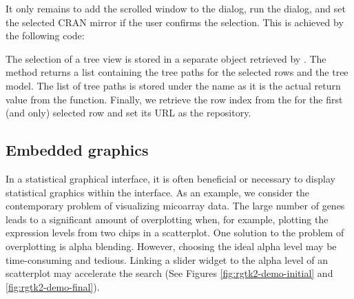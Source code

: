 \documentclass[article,shortnames]{jss}
\begin{document}
It only remains to add the scrolled window to the dialog, run the
dialog, and set the selected CRAN mirror if the user confirms the
selection. This is achieved by the following code:
%
The selection of a tree view is stored in a separate
 object retrieved by
. The  method
returns a list containing the tree paths for the selected rows and the
tree model. The list of tree paths is stored under the name
 as it is the actual return value from the 
function. Finally, we retrieve the row index from the
 for the first (and only) selected row and set its
URL as the repository.


\subsection[Embedded R graphics]{Embedded 
graphics}\label{sec:embedded-graphics}

In a statistical graphical interface, it is often beneficial or
necessary to display statistical graphics within the interface. As
an example, we consider the contemporary problem of visualizing
micoarray data. The large number of genes leads to a significant
amount of overplotting when, for example, plotting the expression
levels from two chips in a scatterplot. One solution to the problem of
overplotting is alpha blending. However, choosing the ideal alpha
level may be time-consuming and tedious. Linking a slider widget to
the alpha level of an  scatterplot may accelerate the
search (See Figures \ref{fig:rgtk2-demo-initial} and
\ref{fig:rgtk2-demo-final}).


\end{document}
